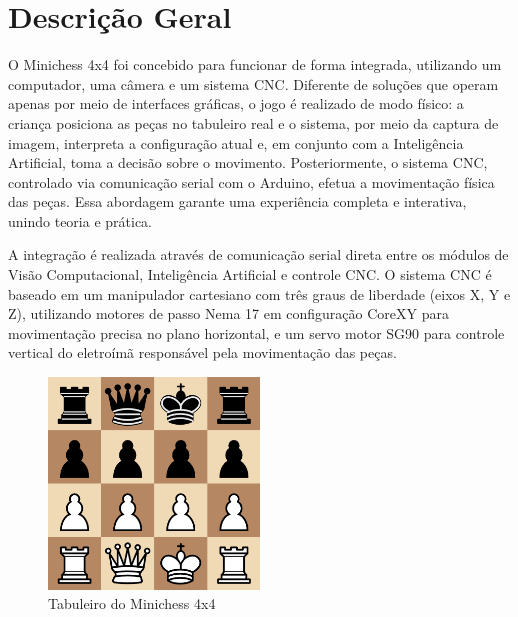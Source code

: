 \documentclass[a4paper,12pt]{article}
\begin{document}
\section{Descrição Geral}  
O Minichess 4x4 foi concebido para funcionar de forma integrada, utilizando um computador, uma câmera e um sistema CNC. Diferente de soluções que operam apenas por meio de interfaces gráficas, o jogo é realizado de modo físico: a criança posiciona as peças no tabuleiro real e o sistema, por meio da captura de imagem, interpreta a configuração atual e, em conjunto com a Inteligência Artificial, toma a decisão sobre o movimento. Posteriormente, o sistema CNC, controlado via comunicação serial com o Arduino, efetua a movimentação física das peças. Essa abordagem garante uma experiência completa e interativa, unindo teoria e prática.  

A integração é realizada através de comunicação serial direta entre os módulos de Visão Computacional, Inteligência Artificial e controle CNC. O sistema CNC é baseado em um manipulador cartesiano com três graus de liberdade (eixos X, Y e Z), utilizando motores de passo Nema 17 em configuração CoreXY para movimentação precisa no plano horizontal, e um servo motor SG90 para controle vertical do eletroímã responsável pela movimentação das peças.  

\begin{figure}[H]  
    \centering  
    \includegraphics[width=0.5\textwidth]{images/minichess4x4.png}   
    \caption{Tabuleiro do Minichess 4x4}  
    \label{fig:modelo_cnc}  
\end{figure}  

\end{document}
